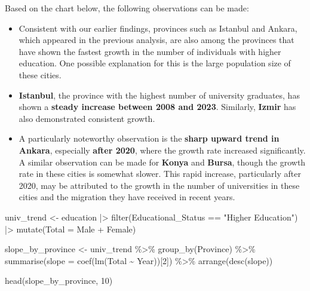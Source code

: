 \documentclass[
  11pt,
  a4paper,
  DIV=11,
  numbers=noendperiod]{scrartcl}
\newenvironment{Shaded}{\begin{snugshade}}{\end{snugshade}}
\newcommand{\AttributeTok}[1]{\textcolor[rgb]{0.40,0.45,0.13}{#1}}
\newcommand{\DecValTok}[1]{\textcolor[rgb]{0.68,0.00,0.00}{#1}}
\newcommand{\FunctionTok}[1]{\textcolor[rgb]{0.28,0.35,0.67}{#1}}
\newcommand{\NormalTok}[1]{\textcolor[rgb]{0.00,0.23,0.31}{#1}}
\newcommand{\OtherTok}[1]{\textcolor[rgb]{0.00,0.23,0.31}{#1}}
\newcommand{\SpecialCharTok}[1]{\textcolor[rgb]{0.37,0.37,0.37}{#1}}
\newcommand{\StringTok}[1]{\textcolor[rgb]{0.13,0.47,0.30}{#1}}
\begin{document}
Based on the chart below, the following observations can be made:

\begin{itemize}
\item
  Consistent with our earlier findings, provinces such as Istanbul and
  Ankara, which appeared in the previous analysis, are also among the
  provinces that have shown the fastest growth in the number of
  individuals with higher education. One possible explanation for this
  is the large population size of these cities.
\item
  {\textbf{Istanbul}}, the province with the highest number of
  university graduates, has shown a {\textbf{steady increase between
  2008 and 2023}}. Similarly, {\textbf{Izmir}} has also demonstrated
  consistent growth.
\item
  A particularly noteworthy observation is the {\textbf{sharp upward
  trend in Ankara}}, especially {\textbf{after 2020}}, where the growth
  rate increased significantly. A similar observation can be made for
  {\textbf{Konya}} and {\textbf{Bursa}}, though the growth rate in these
  cities is somewhat slower. This rapid increase, particularly after
  2020, may be attributed to the growth in the number of universities in
  these cities and the migration they have received in recent years.
\end{itemize}

\begin{Shaded}
\begin{Highlighting}[]
\NormalTok{univ\_trend }\OtherTok{\textless{}{-}}\NormalTok{ education }\SpecialCharTok{|\textgreater{}}
  \FunctionTok{filter}\NormalTok{(Educational\_Status }\SpecialCharTok{==} \StringTok{"Higher Education"}\NormalTok{) }\SpecialCharTok{|\textgreater{}}
  \FunctionTok{mutate}\NormalTok{(}\AttributeTok{Total =}\NormalTok{ Male }\SpecialCharTok{+}\NormalTok{ Female)}

\NormalTok{slope\_by\_province }\OtherTok{\textless{}{-}}\NormalTok{ univ\_trend }\SpecialCharTok{\%\textgreater{}\%}
  \FunctionTok{group\_by}\NormalTok{(Province) }\SpecialCharTok{\%\textgreater{}\%}
  \FunctionTok{summarise}\NormalTok{(}\AttributeTok{slope =} \FunctionTok{coef}\NormalTok{(}\FunctionTok{lm}\NormalTok{(Total }\SpecialCharTok{\textasciitilde{}}\NormalTok{ Year))[}\DecValTok{2}\NormalTok{]) }\SpecialCharTok{\%\textgreater{}\%}
  \FunctionTok{arrange}\NormalTok{(}\FunctionTok{desc}\NormalTok{(slope))}

\FunctionTok{head}\NormalTok{(slope\_by\_province, }\DecValTok{10}\NormalTok{)}
\end{Highlighting}
\end{Shaded}
\end{document}
